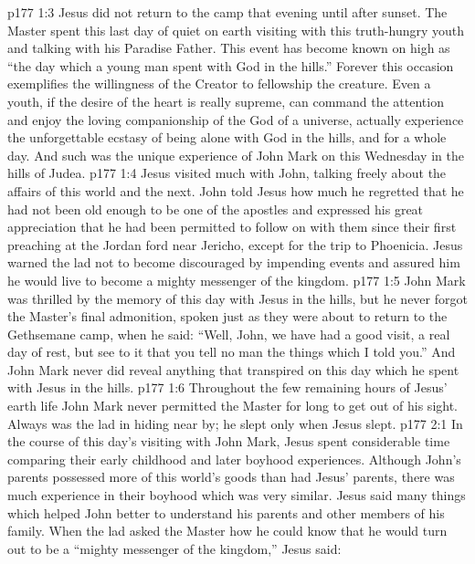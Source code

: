\vs p177 1:3 Jesus did not return to the camp that evening until after sunset. The Master spent this last day of quiet on earth visiting with this truth\hyp{}hungry youth and talking with his Paradise Father. This event has become known on high as “the day which a young man spent with God in the hills.” Forever this occasion exemplifies the willingness of the Creator to fellowship the creature. Even a youth, if the desire of the heart is really supreme, can command the attention and enjoy the loving companionship of the God of a universe, actually experience the unforgettable ecstasy of being alone with God in the hills, and for a whole day. And such was the unique experience of John Mark on this Wednesday in the hills of Judea.
\vs p177 1:4 Jesus visited much with John, talking freely about the affairs of this world and the next. John told Jesus how much he regretted that he had not been old enough to be one of the apostles and expressed his great appreciation that he had been permitted to follow on with them since their first preaching at the Jordan ford near Jericho, except for the trip to Phoenicia. Jesus warned the lad not to become discouraged by impending events and assured him he would live to become a mighty messenger of the kingdom.\plusone
\vs p177 1:5 John Mark was thrilled by the memory of this day with Jesus in the hills, but he never forgot the Master’s final admonition, spoken just as they were about to return to the Gethsemane camp, when he said: \textcolor{ubdarkred}{“Well, John, we have had a good visit, a real day of rest, but see to it that you tell no man the things which I told you.”} And John Mark never did reveal anything that transpired on this day which he spent with Jesus in the hills.
\vs p177 1:6 Throughout the few remaining hours of Jesus’ earth life John Mark never permitted the Master for long to get out of his sight. Always was the lad in hiding near by; he slept only when Jesus slept.
\vs p177 2:1 In the course of this day’s visiting with John Mark, Jesus spent considerable time comparing their early childhood and later boyhood experiences. Although John’s parents possessed more of this world’s goods than had Jesus’ parents, there was much experience in their boyhood which was very similar. Jesus said many things which helped John better to understand his parents and other members of his family. When the lad asked the Master how he could know that he would turn out to be a “mighty messenger of the kingdom,” Jesus said:
